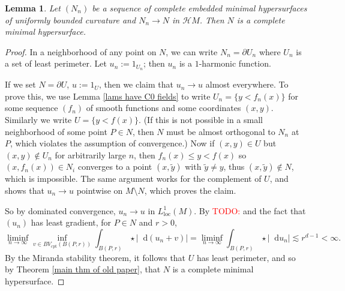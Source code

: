 \documentclass[reqno,11pt]{amsart}
\newcommand*\dif{\mathop{}\!\mathrm{d}}
\newcommand{\Hypspace}{\mathscr H}
\newcommand{\loc}{\mathrm{loc}}
\newcommand{\cpt}{\mathrm{cpt}}
\newtheorem{lemma}[theorem]{Lemma}
\theoremstyle{definition}
\numberwithin{equation}{section}
\newcommand\todo[1]{\textcolor{red}{TODO: #1}}
\begin{document}
\begin{lemma}\label{limit of minimals is minimal}
Let $(N_n)$ be a sequence of complete embedded minimal hypersurfaces of uniformly bounded curvature and $N_n \to N$ in $\Hypspace M$.
Then $N$ is a complete minimal hypersurface.
\end{lemma}
\begin{proof}
In a neighborhood of any point on $N$, we can write $N_n = \partial U_n$ where $U_n$ is a set of least perimeter.
Let $u_n := 1_{U_n}$; then $u_n$ is a $1$-harmonic function.

If we set $N = \partial U$, $u := 1_U$, then we claim that $u_n \to u$ almost everywhere.
To prove this, we use Lemma \ref{lams have C0 fields} to write $U_n = \{y < f_n(x)\}$ for some sequence $(f_n)$ of smooth functions and some coordinates $(x, y)$.
Similarly we write $U = \{y < f(x)\}$.
(If this is not possible in a small neighborhood of some point $P \in N$, then $N$ must be almost orthogonal to $N_n$ at $P$, which violates the assumption of convergence.)
Now if $(x, y) \in U$ but $(x, y) \notin U_n$ for arbitrarily large $n$, then $f_n(x) \leq y < f(x)$ so $(x, f_n(x)) \in N_i$ converges to a point $(x, \tilde y)$ with $\tilde y \neq y$, thus $(x, \tilde y) \notin N$, which is impossible.
The same argument works for the complement of $U$, and shows that $u_n \to u$ pointwise on $M \setminus N$, which proves the claim.

So by dominated convergence, $u_n \to u$ in $L^1_\loc(M)$.
By \todo{\cite{BackusFLG}} and the fact that $(u_n)$ has least gradient, for $P \in N$ and $r > 0$,
$$\liminf_{n \to \infty} \inf_{v \in BV_\cpt(B(P, r))} \int_{B(P, r)} \star |\dif (u_n + v)| = \liminf_{n \to \infty} \int_{B(P, r)} \star |\dif u_n| \lesssim r^{d - 1} < \infty.$$
By the Miranda stability theorem, it follows that $U$ has least perimeter, and so by Theorem \ref{main thm of old paper}, that $N$ is a complete minimal hypersurface.
\end{proof}
\end{document}
